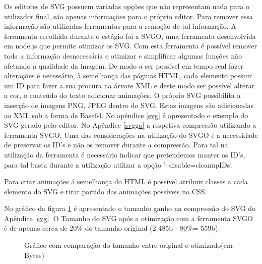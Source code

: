 \par Os editores de SVG possuem variadas opções que não representam nada para o utilizador final, são apenas informações para o próprio editor. Para remover essa informação são utilizadas ferramentas para a remoção de tal informação. A ferramenta escolhida durante o estágio foi a SVGO\cite{svgo}, uma ferramenta desenvolvida em node.js que permite otimizar os SVG. Com esta ferramenta é possível remover toda a informação desnecessária e otimizar e simplificar algumas funções não afetando a qualidade da imagem. De modo a ser possível em tempo real fazer alterações é necessário, à semelhança das páginas HTML, cada elemento possuir um ID para fazer a sua procura na árvore XML e deste modo ser possível alterar a cor, o conteúdo do texto adicionar animações. O próprio SVG possibilita a inserção de imagens PNG, JPEG dentro do SVG. Estas imagens são adicionadas ao XML sob a forma de Base64. No apêndice \ref{svg} é apresentado o exemplo do SVG gerado pelo editor. No Apêndice \ref{svggo} a respetiva compressão utilizando a ferramenta SVGO. Uma das considerações na utilização do SVGO é a necessidade de preservar os ID's e não os remover durante a compressão. Para tal na utilização da ferramenta é necessário indicar que  pretendemos manter os ID's, para tal basta durante a utilização utilizar a opção '--disable=cleanupIDs'.

\par Para criar animações á semelhança do HTML é possível atribuir classes a cada elemento do SVG e tirar partido das animações possíveis no CSS. 
\par No gráfico da figura \ref{compSV} é apresentado o tamanho ganho na compressão do SVG do Apêndice \ref{svg}. O Tamanho do SVG após a otimização com a ferramenta SVGO é de apenas cerca de 20\% do tamanho original (2 485b - 80\%= 559b).

\begin{figure}[ht]
\centering
{}

\caption{Gráfico com comparação do tamanho entre original e otimizado(em Bytes)}\label{compSV}


\end{figure}

